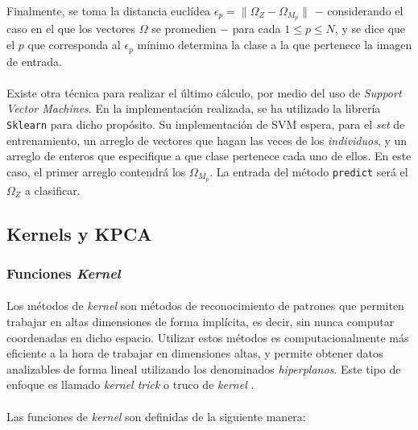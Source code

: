 \documentclass[12pt, twocolumn]{article}
\begin{document}
	\paragraph{} Finalmente, se toma la distancia euclídea $\epsilon_{p} = \lVert \Omega_{Z} - \Omega_{M_{p}} \rVert$ $-$ considerando el caso en el que los vectores $\Omega$ se promedien $-$ para cada $1 \le p \le N$, y se dice que el $p$ que corresponda al $\epsilon_{p}$ mínimo determina la clase a la que pertenece la imagen de entrada. 
	
	\paragraph{} Existe otra técnica para realizar el último cálculo, por medio del uso de \textit{Support Vector Machines}. En la implementación realizada, se ha utilizado la librería \verb|Sklearn| para dicho propósito. Su implementación de SVM espera, para el \textit{set} de entrenamiento, un arreglo de vectores que hagan las veces de los \textit{individuos}, y un arreglo de enteros que especifique a que clase pertenece cada uno de ellos. En este caso, el primer arreglo contendrá los $\Omega_{M_{p}}$. La entrada del método \verb|predict| será el $\Omega_{Z}$ a clasificar. 
	
	\subsection{Kernels y KPCA}
	
	\subsubsection{Funciones \textit{Kernel}}
	
	\paragraph{} Los métodos de \textit{kernel} son métodos de reconocimiento de patrones que permiten trabajar en altas dimensiones de forma implícita, es decir, sin nunca computar coordenadas en dicho espacio. Utilizar estos métodos es computacionalmente más eficiente a la hora de trabajar en dimensiones altas, y permite obtener datos analizables de forma lineal utilizando los denominados \textit{hiperplanos}. Este tipo de enfoque es llamado \textit{kernel trick} o truco de \textit{kernel} \cite{kern1}. 
	
	\paragraph{} Las funciones de \textit{kernel} son definidas de la siguiente manera:
	
\end{document}
